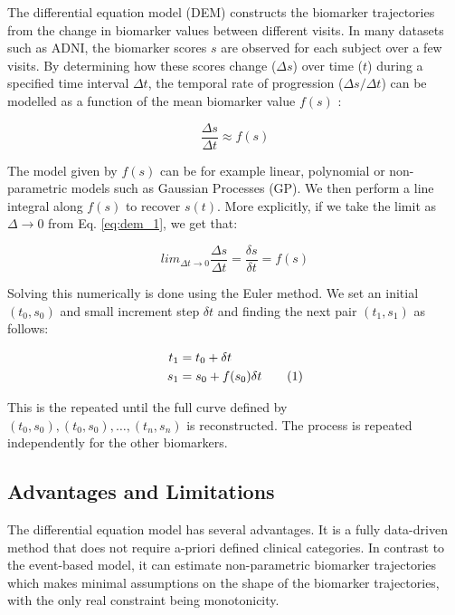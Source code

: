 The differential equation model (DEM) \cite{ashford2001modeling,yang2011quantifying,sabuncu2011dynamics,villemagne2013amyloid} constructs the biomarker trajectories from the change in biomarker values between different visits. In many datasets such as ADNI, the biomarker scores $s$ are observed for each subject over a few visits. By determining how these scores change ($\Delta s$) over time ($t$) during a specified time interval $\Delta t$, the temporal rate of progression ($\Delta s/\Delta t$) can be modelled as a function of the mean biomarker value $f(s)$ \cite{ashford2001modeling}:

\begin{equation}
\label{eq:dem_1}
 \frac{\Delta s}{\Delta t} \approx f(s)
\end{equation}

The model given by $f(s)$ can be for example linear, polynomial or non-parametric models such as Gaussian Processes (GP). We then perform a line integral along $f(s)$ to recover $s(t)$. More explicitly, if we take the limit as $\Delta \xrightarrow{} 0$ from Eq. \ref{eq:dem_1}, we get that:

\begin{equation}
\label{eq:dem2}
lim_{\Delta t \xrightarrow{}  0} \frac{\Delta s}{\Delta t} = \frac{\delta s}{\delta t} = f(s)
\end{equation}

Solving this numerically is done using the Euler method. We set an initial $(t_0,s_0)$ and small increment step $\delta t$ and finding the next pair $(t_1, s_1)$ as follows:

\newcommand\numberthis{\addtocounter{equation}{1}\tag{\theequation}}

\begin{align*}
 t_1 &= t_0 + \delta t \\
 s_1 &= s_0 + f(s_0) \delta t \numberthis \label{eq:dem3}
\end{align*}

This is the repeated until the full curve defined by $(t_0, s_0), (t_0, s_0), \dots, (t_n, s_n)$ is reconstructed. The process is repeated independently for the other biomarkers. 

\subsection{Advantages and Limitations}

The differential equation model has several advantages. It is a fully data-driven method that does not require a-priori defined clinical categories. In contrast to the event-based model, it can estimate non-parametric biomarker trajectories which makes minimal assumptions on the shape of the biomarker trajectories, with the only real constraint being monotonicity. 


